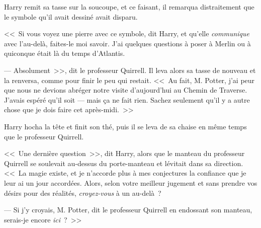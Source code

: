 Harry remit sa tasse sur la soucoupe, et ce faisant, il remarqua distraitement que le symbole qu'il avait dessiné avait disparu.

<<~Si vous voyez une pierre avec ce symbole, dit Harry, et qu'elle \emph{communique} avec l'au-delà, faites-le moi savoir. J'ai quelques questions à poser à Merlin ou à quiconque était là du temps d'Atlantis.

--- Absolument~>>, dit le professeur Quirrell. Il leva alors sa tasse de nouveau et la renversa, comme pour finir le peu qui restait. <<~Au fait, M. Potter, j'ai peur que nous ne devions abréger notre visite d'aujourd'hui au Chemin de Traverse. J'avais espéré qu'il soit — mais ça ne fait rien. Sachez seulement qu'il y a autre chose que je dois faire cet après-midi.~>>

Harry hocha la tête et finit son thé, puis il se leva de sa chaise en même temps que le professeur Quirrell.

<<~Une dernière question~>>, dit Harry, alors que le manteau du professeur Quirrell se soulevait au-dessus du porte-manteau et lévitait dans sa direction. <<~La magie existe, et je n'accorde plus à mes conjectures la confiance que je leur ai un jour accordées. Alors, selon votre meilleur jugement et sans prendre vos désirs pour des réalités, \emph{croyez-vous} à un au-delà~?

--- Si j'y croyais, M. Potter, dit le professeur Quirrell en endossant son manteau, serais-je encore \emph{ici}~?~>>

